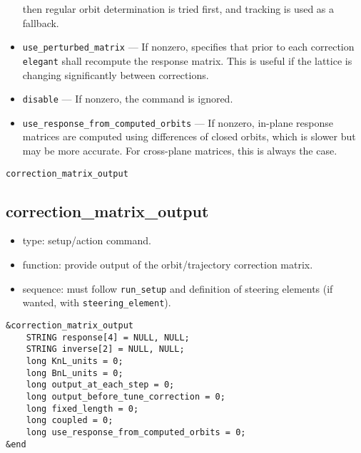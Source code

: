 \documentclass[11pt]{article}
\begin{document}
\begin{itemize}
  then regular orbit determination is tried first, and tracking is used as a fallback.
\item \verb|use_perturbed_matrix| --- If nonzero, specifies that prior to each 
	correction \verb|elegant| shall recompute the response matrix.  This
	is useful if the lattice is changing significantly between corrections.
\item \verb|disable| --- If nonzero, the command is ignored.
\item \verb|use_response_from_computed_orbits| --- If nonzero, in-plane response matrices are computed
  using differences of closed orbits, which is slower but may be more accurate. For cross-plane matrices, this is always the case.
\end{itemize}

\newpage
\begin{center}{\Large\verb|correction_matrix_output|}\end{center}
\subsection{correction\_matrix\_output \label{subsec:correctionmatrixoutput}}

\begin{itemize}
\item type: setup/action command.
\item function: provide output of the orbit/trajectory correction matrix.
\item sequence: must follow \verb|run_setup| and definition of steering elements (if wanted, with \verb|steering_element|).
\end{itemize}

\begin{verbatim}
&correction_matrix_output
    STRING response[4] = NULL, NULL;
    STRING inverse[2] = NULL, NULL;
    long KnL_units = 0;
    long BnL_units = 0;
    long output_at_each_step = 0;
    long output_before_tune_correction = 0;
    long fixed_length = 0;
    long coupled = 0;
    long use_response_from_computed_orbits = 0;
&end
\end{verbatim}
\end{document}
